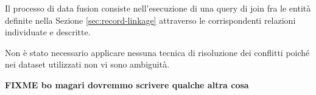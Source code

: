Il processo di data fusion consiste nell'esecuzione di una query di join 
fra le entità definite nella Sezione \ref{sec:record-linkage} attraverso le 
corrispondenti relazioni individuate e descritte.

Non è stato necessario applicare nessuna tecnica di risoluzione dei conflitti 
poiché nei dataset utilizzati non vi sono ambiguità.

\textbf{FIXME bo magari dovremmo scrivere qualche altra cosa}
